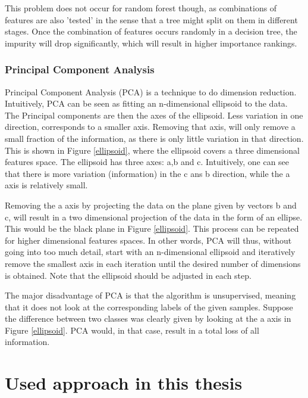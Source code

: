 \npar

This problem does not occur for random forest though, as combinations of features are also 'tested' in the sense that a tree might split on them in different stages. Once the combination of features occurs randomly in a decision tree, the impurity will drop significantly, which will result in higher importance rankings.

\subsubsection{Principal Component Analysis}
Principal Component Analysis (PCA)  is a technique to do dimension reduction. Intuitively, PCA can be seen as fitting an n-dimensional ellipsoid to the data. The Principal components are then the axes of the ellipsoid. Less variation in one direction, corresponds to a smaller axis. Removing that axis, will only remove a small fraction of the information, as there is only little variation in that direction. This is shown in Figure \ref{ellipsoid}, where the ellipsoid covers a three dimensional features space. The ellipsoid has three axes: a,b and c. Intuitively, one can see that there is more variation (information) in the c ans b direction, while the a axis is relatively small.


Removing the a axis by projecting the data on the plane given by vectors b and c, will result in a two dimensional projection of the data in the form of an ellipse. This would be the black plane in Figure \ref{ellipsoid}. This process can be repeated for higher dimensional features spaces. In other words, PCA will thus, without going into too much detail, start with an n-dimensional ellipsoid and iteratively remove the smallest axis in each iteration until the desired number of dimensions is obtained. Note that the ellipsoid should be adjusted in each step.

\npar

The major disadvantage of PCA is that the algorithm is unsupervised, meaning that it does not look at the corresponding labels of the given samples. Suppose the difference between two classes was clearly given by looking at the a axis in Figure \ref{ellipsoid}. PCA would, in that case, result in a total loss of all information.

\section{Used approach in this thesis}

